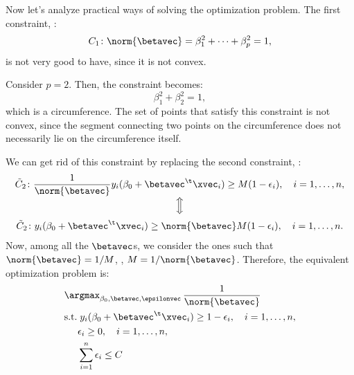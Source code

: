 
Now let's analyze practical ways of solving the optimization problem. The first constraint, \ie:
\begin{equation}
    C_1\colon \norm{\betavec} = \beta^2_1 + \dots + \beta^2_p = 1,
\end{equation}
is not very good to have, since it is not convex.

\begin{example}
    Consider $p = 2$. Then, the constraint becomes:
    \begin{equation}
        \beta^2_1 + \beta^2_2 = 1,
    \end{equation}
    which is a circumference. The set of points that satisfy this constraint is not convex, since the segment connecting two points on the circumference does not necessarily lie on the circumference itself.
\end{example}
We can get rid of this constraint by replacing the second constraint, \ie:
\begin{equation}
    \begin{gathered}
        \tilde{C}_2\colon \frac{1}{\norm{\betavec}}y_i(\beta_0 + \betavec^\t\xvec_i) \geq M(1 - \epsilon_i), \quad i = 1, \dots, n, \\[-3pt]
        \Big\Updownarrow                                                                                                            \\[2pt]
        \tilde{C}_2\colon y_i(\beta_0 + \betavec^\t\xvec_i) \geq \norm{\betavec}M(1 - \epsilon_i), \quad i = 1, \dots, n.
    \end{gathered}
\end{equation}
Now, among all the $\betavec$s, we consider the ones such that $\norm{\betavec} = 1/M$, \ie, $M = 1/\norm{\betavec}$. Therefore, the equivalent optimization problem is:
\begin{equation}
    \begin{aligned}
         & \argmax_{\beta_0, \betavec, \epsilonvec}\,\frac{1}{\norm{\betavec}}                          \\
         & \text{s.t.}\; y_i(\beta_0 + \betavec^\t\xvec_i) \geq 1 - \epsilon_i, \quad i = 1, \dots, n, \\
         & \phantom{s.t.} \epsilon_i \geq 0, \quad i = 1, \dots, n,                                    \\
         & \phantom{s.t.} \sum_{i=1}^n \epsilon_i \leq C                                               \\
    \end{aligned}
\end{equation}
